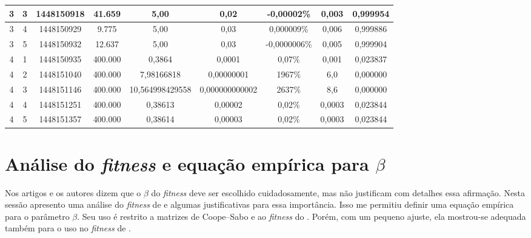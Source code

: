 \begin{landscape}
\begin{center}
\begin{table}[htbp]
\begin{tabular}{ccccccccc}
\hline
         3 &          3 & 1448150918 &     41.659 &       5,00 &       0,02 & -0,00002\% &      0,003 &   0,999954 \\
\hline
         3 &          4 & 1448150929 &      9.775 &       5,00 &       0,03 & 0,000009\% &      0,006 &   0,999886 \\
\hline
         3 &          5 & 1448150932 &     12.637 &       5,00 &       0,03 & -0,0000006\% &      0,005 &   0,999904 \\
\hline \hline
         4 &          1 & 1448150935 &    400.000 &     0,3864 &     0,0001 &     0,07\% &      0,001 &   0,023837 \\
\hline
         4 &          2 & 1448151040 &    400.000 & 7,98166818 & 0,00000001 &     1967\% &        6,0 &   0,000000 \\
\hline
         4 &          3 & 1448151146 &    400.000 & 10,564998429558 & 0,000000000002 &     2637\% &        8,6 &   0,000000 \\
\hline
         4 &          4 & 1448151251 &    400.000 &    0,38613 &    0,00002 &     0,02\% &     0,0003 &   0,023844 \\
\hline
         4 &          5 & 1448151357 &    400.000 &    0,38614 &    0,00003 &     0,02\% &     0,0003 &   0,023844 \\
\hline \hline
\end{tabular}  
\end{table}
\end{center}	
\end{landscape}

	\section{Análise do \emph{fitness} e equação empírica para $\beta$}\label{sec:eq_lambda}
	
	Nos artigos \cite{metodo2004} e \cite{metodo2011} os autores dizem que o $\beta$ do \emph{fitness} deve ser escolhido cuidadosamente, mas não justificam com detalhes essa afirmação. Nesta sessão apresento uma análise do \emph{fitness} de \cite{metodo2011} e algumas justificativas para essa importância. Isso me permitiu definir uma equação empírica para o parâmetro $\beta$. Seu uso é restrito a matrizes de Coope--Sabo e ao \emph{fitness} do \cite{metodo2011}. Porém, com um pequeno ajuste, ela mostrou-se adequada também para o uso no \emph{fitness} de \cite{metodo2004}.
	
